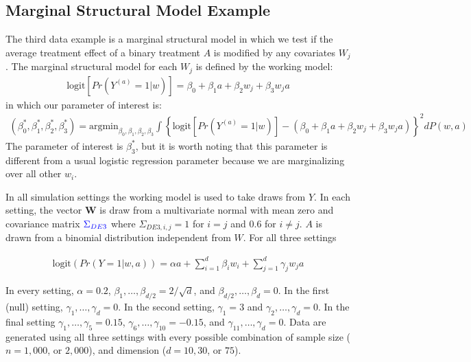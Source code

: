 \documentclass{article}
\begin{document}
\subsection{Marginal Structural Model Example}
\label{sec:msm_data}
The third data example is a marginal structural model in which we test if the average treatment effect of a binary treatment $A$ is modified by any covariates $W_j$.  The marginal structural model for each $W_j$ is defined by the working model:
\begin{align}
\text{logit}\left[Pr(Y^{(a)} = 1 | w)\right] = \beta_0 + \beta_1 a + \beta_2 w_j + \beta_3 w_j a \label{eqn:DE2param}
\end{align}
in which our parameter of interest is:
\begin{align*}
(\beta_0^*, \beta_1^*, \beta_2^*, \beta_3^*) = \text{argmin}_{\beta_0, \beta_1, \beta_2, \beta_3}\int\left\{\text{logit}\left[Pr\left(Y^{(a)} = 1 | w\right)\right] - (\beta_0 + \beta_1 a + \beta_2w_j + \beta_3 w_j a) \right\}^2 dP(w, a)
\end{align*}
The parameter of interest is $\beta_3^*$, but it is worth noting that this parameter is different from a usual logistic regression parameter because we are marginalizing over all other $w_i$.

In all simulation settings the working model is used to take draws from $Y$. In each setting, the vector $\boldsymbol{W}$ is draw from a multivariate normal with mean zero and covariance matrix $\textcolor{blue}{\Sigma_{DE3}}$ where $\Sigma_{DE3, i, j} = 1$ for $i = j$ and $0.6$ for $i \neq j$.  $A$ is drawn from a binomial distribution independent from $W$.  For all three settings 

\begin{align*}
	\text{logit}\left(Pr(Y = 1 | w, a)\right) = \alpha a + \sum_{i = 1}^{d} \beta_{i} w_i + \sum_{j = 1}^d \gamma_{j} w_j a
\end{align*}

In every setting, $\alpha = 0.2$, $\beta_1, \dots, \beta_{d/2} = 2/\sqrt{d}$, and $\beta_{d/2}, \dots, \beta_{d}  = 0$.  In the first (null) setting, $\gamma_{1}, \dots, \gamma_{d} = 0$.  In the second setting, $\gamma_{1} = 3$ and $\gamma_{2}, \dots, \gamma_{d} = 0$.  In the final setting $\gamma_{1}, \dots, \gamma_{5} = 0.15$, $\gamma_{6}, \dots, \gamma_{10} = -0.15$, and $\gamma_{11}, \dots, \gamma_{d} = 0$.
Data are generated using all three settings with every possible combination of sample size ($n = 1,000$, or $2,000$), and dimension ($d = 10, 30$, or $75$).
\end{document}
